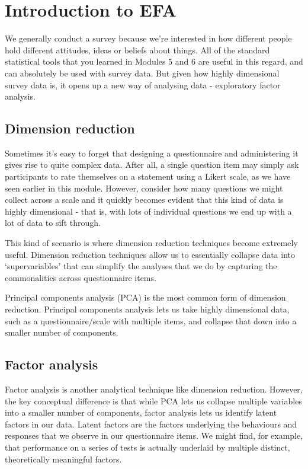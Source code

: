 \documentclass[
]{book}
\begin{document}
\hypertarget{introduction-to-efa}{%
\section{Introduction to EFA}\label{introduction-to-efa}}

We generally conduct a survey because we're interested in how different people hold different attitudes, ideas or beliefs about things. All of the standard statistical tools that you learned in Modules 5 and 6 are useful in this regard, and can absolutely be used with survey data. But given how highly dimensional survey data is, it opens up a new way of analysing data - exploratory factor analysis.

\hypertarget{dimension-reduction}{%
\subsection{Dimension reduction}\label{dimension-reduction}}

Sometimes it's easy to forget that designing a questionnaire and administering it gives rise to quite complex data. After all, a single question item may simply ask participants to rate themselves on a statement using a Likert scale, as we have seen earlier in this module. However, consider how many questions we might collect across a scale and it quickly becomes evident that this kind of data is highly dimensional - that is, with lots of individual questions we end up with a lot of data to sift through.

This kind of scenario is where dimension reduction techniques become extremely useful. Dimension reduction techniques allow us to essentially collapse data into `supervariables' that can simplify the analyses that we do by capturing the commonalities across questionnaire items.

Principal components analysis (PCA) is the most common form of dimension reduction. Principal components analysis lets us take highly dimensional data, such as a questionnaire/scale with multiple items, and collapse that down into a smaller number of components.

\hypertarget{factor-analysis}{%
\subsection{Factor analysis}\label{factor-analysis}}

Factor analysis is another analytical technique like dimension reduction. However, the key conceptual difference is that while PCA lets us collapse multiple variables into a smaller number of components, factor analysis lets us identify latent factors in our data. Latent factors are the factors underlying the behaviours and responses that we observe in our questionnaire items. We might find, for example, that performance on a series of tests is actually underlaid by multiple distinct, theoretically meaningful factors.
\end{document}

